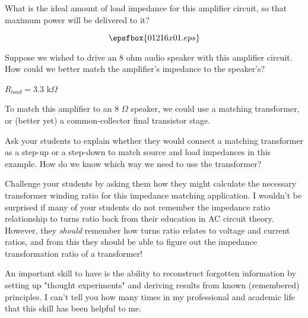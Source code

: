 

What is the ideal amount of load impedance for this amplifier circuit, so that maximum power will be delivered to it?

$$\epsfbox{01216x01.eps}$$

Suppose we wished to drive an 8 ohm audio speaker with this amplifier circuit.  How could we better match the amplifier's impedance to the speaker's?







$R_{load} = 3.3$ k$\Omega$

\vskip 10pt

To match this amplifier to an 8 $\Omega$ speaker, we could use a matching transformer, or (better yet) a common-collector final transistor stage.







Ask your students to explain whether they would connect a matching transformer as a step-up or a step-down to match source and load impedances in this example.  How do we know which way we need to use the transformer?

Challenge your students by asking them how they might calculate the necessary transformer winding ratio for this impedance matching application.  I wouldn't be surprised if many of your students do not remember the impedance ratio relationship to turns ratio back from their education in AC circuit theory.  However, they {\it should} remember how turns ratio relates to voltage and current ratios, and from this they should be able to figure out the impedance transformation ratio of a transformer!

An important skill to have is the ability to reconstruct forgotten information by setting up "thought experiments" and deriving results from known (remembered) principles.  I can't tell you how many times in my professional and academic life that this skill has been helpful to me.




